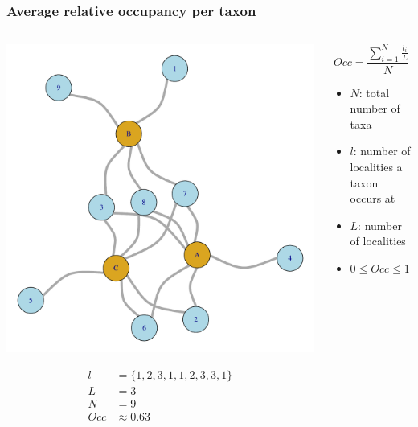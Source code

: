 \documentclass{beamer}
\begin{document}
\begin{frame}
  \frametitle{Average relative occupancy per taxon}

  \begin{columns}
    \begin{column}{0.5\textwidth}
      \begin{center}
        \includegraphics[height = 0.5\textheight, width = \textwidth, keepaspectratio = true]{figure/sim_graph}

        \begin{align*}
          l &= \{1, 2, 3, 1, 1, 2, 3, 3, 1\}\\
          L &= 3\\
          N &= 9\\
          Occ &\approx 0.63 
        \end{align*}
      \end{center}
    \end{column}
    \begin{column}{0.5\textwidth}
      \[
        Occ = \frac{\sum_{i = 1}^{N} \frac{l_{i}}{L}}{N}
      \]

      \begin{itemize}
        \item \(N\): total number of taxa
        \item \(l\): number of localities a taxon occurs at
        \item \(L\): number of localities
        \item \(0 \leq Occ \leq 1\)
      \end{itemize}
    \end{column}
  \end{columns}
\end{frame}
\end{document}
